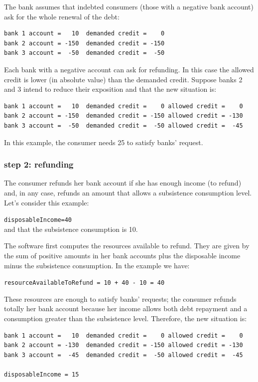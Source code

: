\documentclass{article}
\begin{document}
The bank assumes that indebted consumers (those with a negative bank account) ask for the whole renewal of the debt:

\begin{verbatim}
bank 1 account =   10  demanded credit =    0
bank 2 account = -150  demanded credit = -150
bank 3 account =  -50  demanded credit =  -50
\end{verbatim}

Each bank with a negative account can ask for refunding. In this case the allowed credit is lower (in absolute value) than the demanded credit.
Suppose banks 2 and 3 intend to reduce their exposition and that the new situation is:

\begin{verbatim}
bank 1 account =   10  demanded credit =    0 allowed credit =    0
bank 2 account = -150  demanded credit = -150 allowed credit = -130 
bank 3 account =  -50  demanded credit =  -50 allowed credit =  -45
\end{verbatim}

In this example, the consumer needs 25 to satisfy banks' request.

\subsubsection*{step 2: refunding}
The consumer refunds her bank account if she has enough income (to refund) and, in any case, refunds an amount that allows a subsistence consumption level. 
\\Let's consider this example:

\verb+disposableIncome=40+\\
and that the subsistence consumption is 10.

The software first computes the resources available to refund. They are given by 
the sum of positive amounts in her bank accounts plus the disposable income minus the subsistence consumption. In the example we have:

\verb/resourceAvailableToRefund = 10 + 40 - 10 = 40/

These resources are enough to satisfy banks' requests; the consumer refunds totally her bank account because her income allows both debt repayment and a consumption greater than the subsistence level. 
Therefore, the new situation is:

\begin{verbatim}
bank 1 account =   10  demanded credit =    0 allowed credit =    0
bank 2 account = -130  demanded credit = -150 allowed credit = -130 
bank 3 account =  -45  demanded credit =  -50 allowed credit =  -45

disposableIncome = 15
\end{verbatim}
\end{document}
